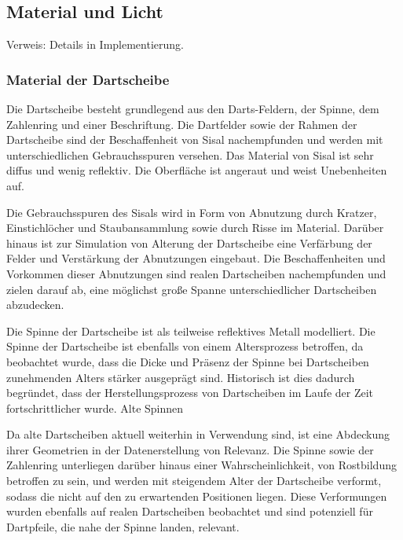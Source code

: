 
\subsection{Material und Licht}  %
\label{sec:material_licht}

Verweis: Details in Implementierung.

\subsubsection{Material der Dartscheibe}

Die Dartscheibe besteht grundlegend aus den Darts-Feldern, der Spinne, dem Zahlenring und einer Beschriftung. Die Dartfelder sowie der Rahmen der Dartscheibe sind der Beschaffenheit von Sisal nachempfunden und werden mit unterschiedlichen Gebrauchsspuren versehen. Das Material von Sisal ist sehr diffus und wenig reflektiv. Die Oberfläche ist angeraut und weist Unebenheiten auf.

Die Gebrauchsspuren des Sisals wird in Form von Abnutzung durch Kratzer, Einstichlöcher und Staubansammlung sowie durch Risse im Material. Darüber hinaus ist zur Simulation von Alterung der Dartscheibe eine Verfärbung der Felder und Verstärkung der Abnutzungen eingebaut. Die Beschaffenheiten und Vorkommen dieser Abnutzungen sind realen Dartscheiben nachempfunden und zielen darauf ab, eine möglichst große Spanne unterschiedlicher Dartscheiben abzudecken.

Die Spinne der Dartscheibe ist als teilweise reflektives Metall modelliert. Die Spinne der Dartscheibe ist ebenfalls von einem Altersprozess betroffen, da beobachtet wurde, dass die Dicke und Präsenz der Spinne bei Dartscheiben zunehmenden Alters stärker ausgeprägt sind. Historisch ist dies dadurch begründet, dass der Herstellungsprozess von Dartscheiben im Laufe der Zeit fortschrittlicher wurde. Alte Spinnen

Da alte Dartscheiben aktuell weiterhin in Verwendung sind, ist eine Abdeckung ihrer Geometrien in der Datenerstellung von Relevanz. Die Spinne sowie der Zahlenring unterliegen darüber hinaus einer Wahrscheinlichkeit, von Rostbildung betroffen zu sein, und werden mit steigendem Alter der Dartscheibe verformt, sodass die nicht auf den zu erwartenden Positionen liegen. Diese Verformungen wurden ebenfalls auf realen Dartscheiben beobachtet und sind potenziell für Dartpfeile, die nahe der Spinne landen, relevant.

